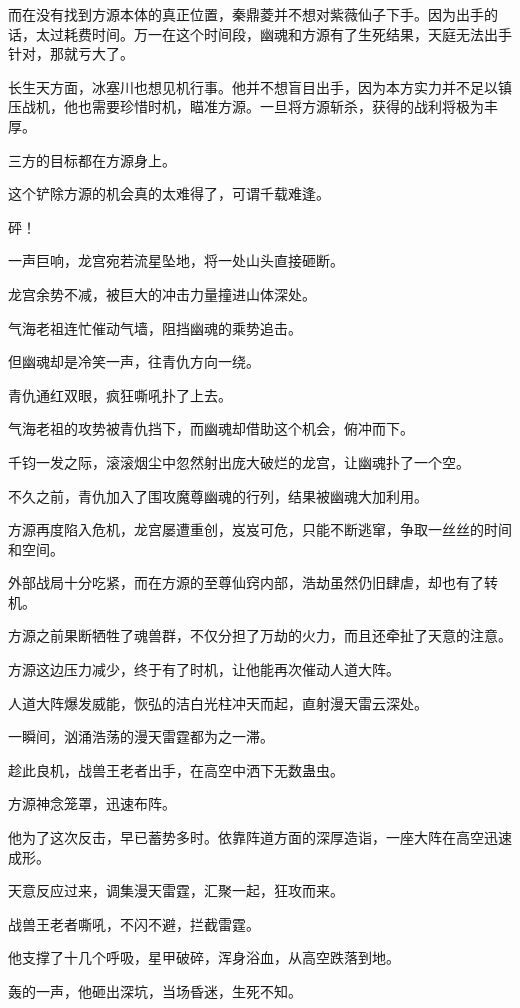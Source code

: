 \begin{this_body}
而在没有找到方源本体的真正位置，秦鼎菱并不想对紫薇仙子下手。因为出手的话，太过耗费时间。万一在这个时间段，幽魂和方源有了生死结果，天庭无法出手针对，那就亏大了。

长生天方面，冰塞川也想见机行事。他并不想盲目出手，因为本方实力并不足以镇压战机，他也需要珍惜时机，瞄准方源。一旦将方源斩杀，获得的战利将极为丰厚。

三方的目标都在方源身上。

这个铲除方源的机会真的太难得了，可谓千载难逢。

砰！

一声巨响，龙宫宛若流星坠地，将一处山头直接砸断。

龙宫余势不减，被巨大的冲击力量撞进山体深处。

气海老祖连忙催动气墙，阻挡幽魂的乘势追击。

但幽魂却是冷笑一声，往青仇方向一绕。

青仇通红双眼，疯狂嘶吼扑了上去。

气海老祖的攻势被青仇挡下，而幽魂却借助这个机会，俯冲而下。

千钧一发之际，滚滚烟尘中忽然射出庞大破烂的龙宫，让幽魂扑了一个空。

不久之前，青仇加入了围攻魔尊幽魂的行列，结果被幽魂大加利用。

方源再度陷入危机，龙宫屡遭重创，岌岌可危，只能不断逃窜，争取一丝丝的时间和空间。

外部战局十分吃紧，而在方源的至尊仙窍内部，浩劫虽然仍旧肆虐，却也有了转机。

方源之前果断牺牲了魂兽群，不仅分担了万劫的火力，而且还牵扯了天意的注意。

方源这边压力减少，终于有了时机，让他能再次催动人道大阵。

人道大阵爆发威能，恢弘的洁白光柱冲天而起，直射漫天雷云深处。

一瞬间，汹涌浩荡的漫天雷霆都为之一滞。

趁此良机，战兽王老者出手，在高空中洒下无数蛊虫。

方源神念笼罩，迅速布阵。

他为了这次反击，早已蓄势多时。依靠阵道方面的深厚造诣，一座大阵在高空迅速成形。

天意反应过来，调集漫天雷霆，汇聚一起，狂攻而来。

战兽王老者嘶吼，不闪不避，拦截雷霆。

他支撑了十几个呼吸，星甲破碎，浑身浴血，从高空跌落到地。

轰的一声，他砸出深坑，当场昏迷，生死不知。


\end{this_body}
